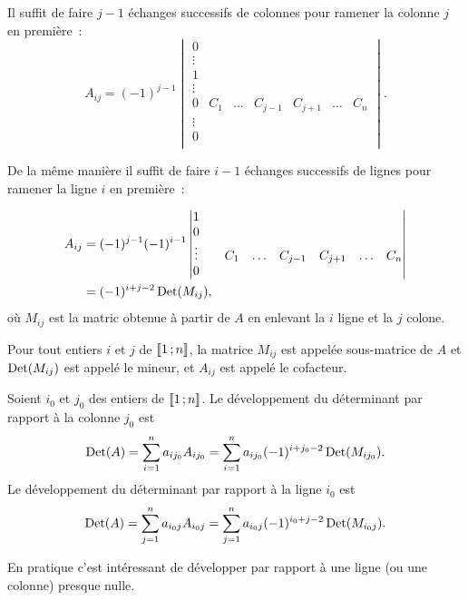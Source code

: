Il suffit de faire $j-1$ échanges successifs de colonnes pour ramener la colonne $j$ en première~:
\begin{equation}
  A_{ij} = (-1)^{j-1} 
\begin{vmatrix} 
      0     &        &        &      &       &        &  \\
     \vdots &        &        &      &       &        &  \\
      1     &        &        &      &       &        &  \\
     \vdots &        &        &      &       &        &  \\
      0     & C_1    & \ldots & C_{j-1}&C_{j+1} & \ldots & C_{n} \\
     \vdots &        &        &      &       &        &  \\
      0     &        &        &      &       &        &  \\    
  \end{vmatrix}.
\end{equation}

De la même manière il suffit de faire $i-1$ échanges successifs de lignes pour ramener la ligne $i$ en première~:

\begin{align}
  A_{ij} &= (-1)^{j-1} (-1)^{i-1}
\begin{vmatrix} 
      1     &        &        &       &      &        & \\
      0     &        &        &      &       &        &  \\    
     \vdots &        & C_1    & \ldots & C_{j-1}&C_{j+1} & \ldots & C_{n} \\
      0     &        &        &      &       &        &  \\    
  \end{vmatrix}\\
  &=(-1)^{i+j-2} \operatorname{Det}(M_{ij}),
\end{align}
où $M_{ij}$ est la matric obtenue à partir de $A$ en enlevant la $i$\ieme{} ligne et la $j$\ieme{} colone.

\begin{defdef}
  Pour tout entiers $i$ et $j$ de $\mathopen{\llbracket}1\mathclose{}\mathpunct{};n\mathclose{\rrbracket}$, la matrice $M_{ij}$ est appelée sous-matrice de $A$ et $\operatorname{Det}(M_{ij})$ est appelé le mineur, et $A_{ij}$ est appelé le cofacteur.
\end{defdef}
%
\begin{theo}
  Soient $i_0$ et $j_0$ des entiers de $\mathopen{\llbracket}1\mathclose{}\mathpunct{};n\mathclose{\rrbracket}$. Le développement du déterminant par rapport à la colonne $j_0$ est
  \begin{equation}
    \operatorname{Det}(A) = \sum_{i=1}^n a_{ij_0}A_{ij_0} = \sum_{i=1}^n a_{ij_0}(-1)^{i+j_0-2} \operatorname{Det}(M_{ij_0}).
  \end{equation}
  Le développement du déterminant par rapport à la ligne $i_0$ est
  \begin{equation}
    \operatorname{Det}(A) = \sum_{j=1}^n a_{i_0j}A_{i_0j} = \sum_{j=1}^n a_{i_0j}(-1)^{i_0+j-2} \operatorname{Det}(M_{i_0j}).
  \end{equation}

  En pratique c'est intéressant de développer par rapport à une ligne (ou une colonne) presque nulle.
\end{theo}

